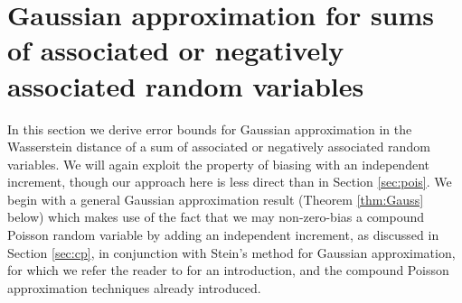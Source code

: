 \documentclass[12pt]{article}
\begin{document}
\section{Gaussian approximation for sums of associated or negatively associated random variables}\label{sec:normal}

In this section we derive error bounds for Gaussian approximation in the Wasserstein distance of a sum of associated or negatively associated random variables. We will again exploit the property of biasing with an independent increment, though our approach here is less direct than in Section \ref{sec:pois}. We begin with a general Gaussian approximation result (Theorem \ref{thm:Gauss} below) which makes use of the fact that we may non-zero-bias a compound Poisson random variable by adding an independent increment, as discussed in Section \ref{sec:cp}, in conjunction with Stein's method for Gaussian approximation, for which we refer the reader to \cite{chen11} for an introduction, and the compound Poisson approximation techniques already introduced. 
\end{document}
